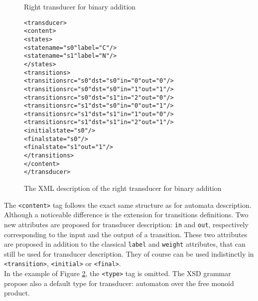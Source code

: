 \documentclass[a4paper]{llncs}
\begin{document}
\begin{figure}[h]
  \begin{center}
\ShowFrame
\ShowGrid
{}
\caption{Right transducer for binary addition}
\label{binadd}
  \end{center}
\end{figure}

{\small
\begin{figure}[h]
  \begin{center}
\begin{alltt}
<transducer>
  <content>
    <states>
       <state name="s0" label="C"/>
       <state name="s1" label="N"/>
    </states>
    <transitions>
       <transition src="s0" dst="s0" in="0" out="0"/>
       <transition src="s0" dst="s0" in="1" out="1"/>
       <transition src="s0" dst="s1" in="2" out="0"/>
       <transition src="s1" dst="s0" in="0" out="1"/>
       <transition src="s1" dst="s1" in="1" out="0"/>
       <transition src="s1" dst="s1" in="2" out="1"/>
       <initial state="s0"/>
       <final state="s0"/>
       <final state="s1" out="1"/>
    </transitions>
  </content>
</transducer>
\end{alltt}

\caption{The XML description of the right transducer for binary addition}
\label{binaddxml}
  \end{center}
\end{figure}

}

The \verb|<content>| tag follows the exact same structure as for automata
description. Although a noticeable difference is the extension for
transitions definitions. Two new attributes are proposed for transducer
description: \verb|in| and \verb|out|, respectively corresponding to
the input and the output of a transition. These two attributes are
proposed in addition to the classical \verb|label| and \verb|weight|
attributes, that can still be used for transducer description. They of
course can be used indistinctly in \verb|<transition>|,
\verb|<initial>| or \verb|<final>|. \\


In the example of Figure \ref{binaddxml}, the \verb|<type>| tag is
omitted. The XSD grammar propose also a default type for transducer:
automaton over the free monoid product.
\end{document}
